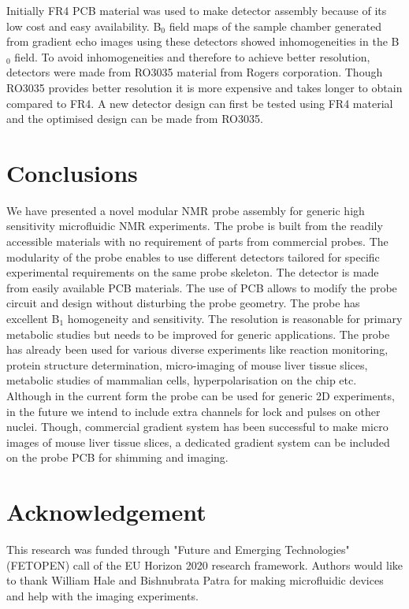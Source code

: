 \documentclass[preprint,12pt]{article}
\begin{document}
Initially FR4 PCB material was used to make detector assembly because of its low cost and easy availability. B$_0$ field maps of the sample chamber generated from gradient echo images using these detectors showed inhomogeneities in the B$_0$ field. To avoid inhomogeneities and therefore to achieve better resolution, detectors were made from RO3035 material from Rogers corporation. Though RO3035 provides better resolution it is more expensive and takes longer to obtain compared to FR4. A new detector design can first be tested using FR4 material and the optimised design can be made from RO3035.
\section{Conclusions}
We have presented a novel modular NMR probe assembly for generic high sensitivity microfluidic NMR experiments. The probe is built from the readily accessible materials with no requirement of parts from commercial probes. The modularity of the probe enables to use different detectors tailored for specific experimental requirements on the same probe skeleton. The detector is made from easily available PCB materials. The use of PCB allows to modify the probe circuit and design without disturbing the probe geometry. The probe has excellent B$_1$ homogeneity and sensitivity. The resolution is reasonable for primary metabolic studies but needs to be improved for generic applications. The probe has already been used for various diverse experiments like reaction monitoring, protein structure determination, micro-imaging of mouse liver tissue slices, metabolic studies of mammalian cells, hyperpolarisation on the chip etc. Although in the current form the probe can be used for generic 2D experiments, in the future we intend to include extra channels for lock and pulses on other nuclei. Though, commercial gradient system has been successful to make micro images of mouse liver tissue slices, a dedicated gradient system can be included on the probe PCB for shimming and imaging.
\section{Acknowledgement}
This research was funded through "Future and Emerging Technologies" (FETOPEN) call of the EU Horizon 2020 research framework. Authors would like to thank William Hale and Bishnubrata Patra for making microfluidic devices and help with the imaging experiments.
\clearpage


\end{document}
